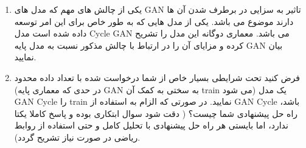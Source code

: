 

\begin{enumerate}[label=(\alph*)]
	
	\item
	یکی از چالش های مهم که مدل های GAN تاثیر به سزایی در برطرف شدن آن ها دارند موضوع  می باشد. یکی از مدل هایی که به طور خاص برای این امر توسعه داده شده است مدل Cycle GAN می باشد. معماری دوگانه این مدل را تشریح کرده و مزایای آن را در ارتباط با چالش مذکور نسبت به مدل پایه GAN بیان نمایید.
	
	\item
	فرض کنید تحت شرایطی بسیار خاص از شما درخواست شده با تعداد داده محدود (در حدی که معماری پایه GAN به سختی به کمک آن train می شود) یک مدل GAN Cycle را train نمایید. در صورتی که الزام به استفاده از GAN Cycle باشد، راه حل پیشنهادی شما چیست؟ ( دقت شود سوال ابتکاری بوده و پاسخ کاملا یکتا ندارد، اما بایستی هر راه حل پیشنهادی با تحلیل کامل و حتی استفاده از روابط ریاضی در صورت نیاز تشریح گردد).
	
\end{enumerate}